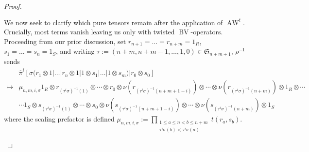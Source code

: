 \documentclass{article}
\makeatletter
\newcommand{\bv}{\operatorname{BV}}
\newcommand{\awt}{\operatorname{AW}^t}
\theoremstyle{plain}
\theoremstyle{definition}
\def\namedlabel#1#2{\begingroup
    #2%
    \def\@currentlabel{#2}%
    \phantomsection\label{#1}\endgroup 
}
\makeatother
\begin{document}
\begin{proof}
\begin{pfparts}
 \item[\namedlabel{pfpart:kernelofawt}{The Kernel of $\mathbf{\awt}$.}]
We now seek to clarify which pure tensors remain after the application of $\awt$. Crucially, most terms vanish leaving us only with twisted $\bv$-operators. Proceeding from our prior discussion, set $r_{n+1}=\ldots=r_{n+m}=1_R$, $s_{1} = \ldots = s_{n}=1_S$, and writing $\tau := (n+m, n+m-1, \ldots, 1, 0) \in \mathfrak{S}_{n+m+1}$, $\rho^{-1}$ sends
$$\begin{aligned}
& \hat{\pi}^i[\sigma (r_1 \otimes 1 |\ldots | r_n \otimes 1 | 1 \otimes  s_1 | \ldots | 1 \otimes s_m) | r_0 \otimes s_0]\\
\mapsto& \mu_{n,m,i,\sigma}1_R \otimes  r_{(\tau^i\sigma)^{-1}(1)} \otimes \cdots \otimes r_0 \otimes \nu(r_{(\tau^i\sigma)^{-1}(n+m+1-i)}) \otimes \cdots \otimes  \nu(r_{(\tau^i\sigma)^{-1}(n+m)}) \otimes 1_R \otimes \cdots \\
& \cdots 1_S \otimes  s_{(\tau^i\sigma)^{-1}(1)} \otimes \cdots \otimes s_0 \otimes \nu(s_{(\tau^i\sigma)^{-1}(n+m+1-i)}) \otimes \cdots \otimes  \nu(s_{(\tau^i\sigma)^{-1}(n+m)}) \otimes 1_S
\end{aligned}$$
where the scaling prefactor is defined $\mu_{n,m,i,\sigma}:=\prod_{\substack{1 \leq a \leq n < b \leq n+m \\ \tau^i\sigma(b) < \tau^i\sigma(a)}} t(r_a, s_b)$.\\[2pt]


\end{pfparts}
\end{proof}
\end{document}
